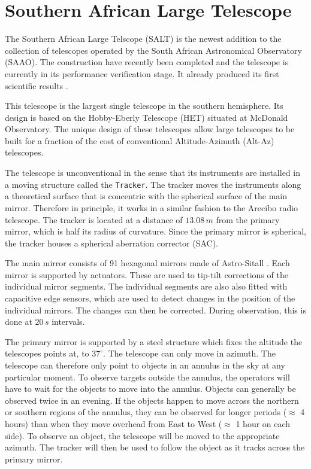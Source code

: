\label{meth_spec}

\section{Southern African Large Telescope}
\label{SALT}

The Southern African Large Telscope (SALT) is the newest addition to the collection of telescopes operated by the South African Astronomical Observatory (SAAO). The construction have recently been completed and the telescope is currently in its performance verification stage. It already produced its first scientific results \citep{salt_first_science}.

This telescope is the largest single telescope in the southern hemisphere. Its design is based on the Hobby-Eberly Telescope (HET) situated at McDonald Observatory. The unique design of these telescopes allow large telescopes to be built for a fraction of the cost of conventional Altitude-Azimuth (Alt-Az) telescopes. 

The telescope is unconventional in the sense that its instruments are installed in a moving structure called the \texttt{Tracker}. The tracker moves the instruments along a theoretical surface that is concentric with the spherical surface of the main mirror. Therefore in principle, it works in a similar fashion to the Arecibo radio telescope. The tracker is located at a distance of $13.08 \hspace{2pt}m$ from the primary mirror, which is half its radius of curvature. Since the primary mirror is spherical, the tracker houses a spherical aberration corrector (SAC)\citep{dod2000}.

The main mirror consists of 91 hexagonal mirrors made of Astro-Sitall \citep{swiegers}. Each mirror is supported by  actuators. These are used to tip-tilt corrections of the individual mirror segments. The individual segments are also also fitted with capacitive edge sensors, which are used to detect changes in the position of the individual mirrors. The changes can then be corrected. During observation, this is done at $20\hspace{2pt}s$ intervals.

The primary mirror is supported by a steel structure which fixes the altitude the telescopes points at, to $37^{\circ}$. The telescope can only move in azimuth. The telescope can therefore only point to objects in an annulus in the sky at any particular moment. To observe targets outside the annulus, the operators will have to wait for the objects to move into the annulus. Objects can generally be observed twice in an evening. If the objects happen to move across the northern or southern regions of the annulus, they can be observed for longer periods ($\approx$ 4 hours) than when they move overhead from East to West ($\approx $ 1 hour on each side). To observe an object, the telescope will be moved to the appropriate azimuth. The tracker will then be used to follow the object as it tracks across the primary mirror.

